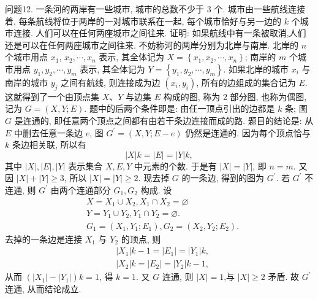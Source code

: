 问题12. 一条河的两岸有一些城市, 城市的总数不少于 3 个.
城市由一些航线连接着, 每条航线将位于两岸的一对城市联系在一起, 每个城市恰好与另一边的 $k$ 个城市连接.
人们可以在任何两座城市之间往来.
证明: 如果航线中有一条被取消,人们还是可以在任何两座城市之间往来.
不妨称河的两岸分别为北岸与南岸.
北岸的 $n$ 个城市用点 $x_1$, $x_2, \cdots, x_n$ 表示, 其全体记为 $X=\left\{x_1, x_2, \cdots, x_n\right\}$; 南岸的 $m$ 个城市用点 $y_1, y_2, \cdots, y_m$ 表示, 其全体记为 $Y=\left\{y_1, y_2, \cdots, y_m\right\}$. 如果北岸的城市 $x_i$ 与南岸的城市 $y_j$ 之间有航线, 则连接成为边 $\left(x_i, y_i\right)$, 所有的边组成的集合记为 $E$. 这就得到了一个由顶点集 $X 、 Y$ 与边集 $E$ 构成的图, 称为 2 部分图, 也称为偶图, 记为 $G=(X, Y ; E)$. 题中的后两个条件即是: 由任一顶点引出的边都是 $k$ 条; 图 $G$ 是连通的, 即任意两个顶点之间都有由若干条边连接而成的路.
题目的结论是: 从 $E$ 中删去任意一条边 $e$, 图 $G^{\prime}=(X, Y ; E-e)$ 仍然是连通的.
因为每个顶点恰与 $k$ 条边相关联, 所以有
$$
|X| k=|E|=|Y| k,
$$
其中 $|X|,|E|,|Y|$ 表示集合 $X, E, Y$ 中元素的个数.
于是有 $|X|=|Y|$, 即 $n=m$. 又因 $|X|+|Y| \geqslant 3$, 所以 $|X|=|Y| \geqslant 2$.
现去掉 $G$ 的一条边, 得到的图为 $G^{\prime}$. 若 $G^{\prime}$ 不连通, 则 $G^{\prime}$ 由两个连通部分 $G_1, G_2$ 构成.
设
$$
\begin{aligned}
& X=X_1 \cup X_2, X_1 \cap X_2=\varnothing \\
& Y=Y_1 \cup Y_2, Y_1 \cap Y_2=\varnothing . \\
& G_1=\left(X_1, Y_1 ; E_1\right), G_2=\left(X_2, Y_2 ; E_2\right) .
\end{aligned}
$$
去掉的一条边是连接 $X_1$ 与 $Y_2$ 的顶点, 则
$$
\begin{aligned}
& \left|X_1\right| k-1=\left|E_1\right|=\left|Y_1\right| k, \\
& \left|X_2\right| k=\left|E_2\right|=\left|Y_2\right| k-1,
\end{aligned}
$$
从而 $\left(\left|X_1\right|-\left|Y_1\right|\right) k=1$, 得 $k=1$.
又 $G$ 连通, 则 $|X|=1$,与 $|X| \geqslant 2$ 矛盾.
故 $G^{\prime}$ 连通, 从而结论成立.


